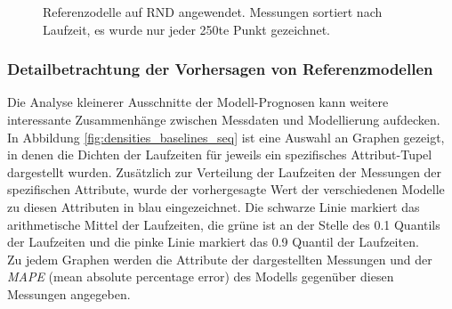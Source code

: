 \documentclass[
	twoside,
	12pt,
	a4paper,
	BCOR10mm,
	DIV14,
	listof=totoc,
	bibliography=totoc,
	headsepline
]{scrreprt}
\begin{document}
\begin{figure}
	\centering
	\hfill
	\caption{Referenzodelle auf RND angewendet. Messungen sortiert nach Laufzeit, es wurde nur jeder 250te Punkt gezeichnet.}
	\label{fig:zeit_baselines_sorted_rnd}
\end{figure} 
\clearpage
\subsubsection{Detailbetrachtung der Vorhersagen von Referenzmodellen}
Die Analyse kleinerer Ausschnitte der Modell-Prognosen kann weitere interessante Zusammenhänge zwischen Messdaten und Modellierung aufdecken.\\
In Abbildung \ref{fig:densities_baselines_seq} ist eine Auswahl an Graphen gezeigt, in denen die Dichten der Laufzeiten für jeweils ein spezifisches Attribut-Tupel dargestellt wurden.
Zusätzlich zur Verteilung der Laufzeiten der Messungen der spezifischen Attribute, wurde der vorhergesagte Wert der verschiedenen Modelle zu diesen Attributen in blau eingezeichnet.
Die schwarze Linie markiert das arithmetische Mittel der Laufzeiten, die grüne ist an der Stelle des 0.1 Quantils der Laufzeiten und die pinke Linie markiert das 0.9 Quantil der Laufzeiten.\\
Zu jedem Graphen werden die Attribute der dargestellten Messungen und der \textit{MAPE} (mean absolute percentage error) des Modells gegenüber diesen Messungen angegeben.\medskip
\end{document}
